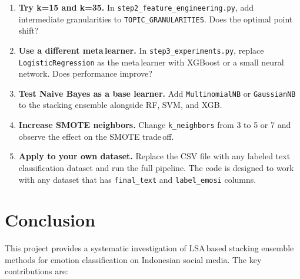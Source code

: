 \documentclass[12pt,a4paper,twoside]{article}
\theoremstyle{definition}
\begin{document}
\begin{enumerate}[leftmargin=2em]
    \item \textbf{Try k=15 and k=35.} In \texttt{step2\_feature\_engineering.py}, add intermediate granularities to \texttt{TOPIC\_GRANULARITIES}. Does the optimal point shift?

    \item \textbf{Use a different meta\,learner.} In \texttt{step3\_experiments.py}, replace \texttt{LogisticRegression} as the meta\,learner with XGBoost or a small neural network. Does performance improve?

    \item \textbf{Test Naive Bayes as a base learner.} Add \texttt{MultinomialNB} or \texttt{GaussianNB} to the stacking ensemble alongside RF, SVM, and XGB.

    \item \textbf{Increase SMOTE neighbors.} Change \texttt{k\_neighbors} from 3 to 5 or 7 and observe the effect on the SMOTE trade\,off.

    \item \textbf{Apply to your own dataset.} Replace the CSV file with any labeled text classification dataset and run the full pipeline. The code is designed to work with any dataset that has \texttt{final\_text} and \texttt{label\_emosi} columns.
\end{enumerate}

\section{Conclusion}
\label{sec:conclusion}

This project provides a systematic investigation of LSA\,based stacking ensemble methods for emotion classification on Indonesian social media. The key contributions are:
\end{document}
